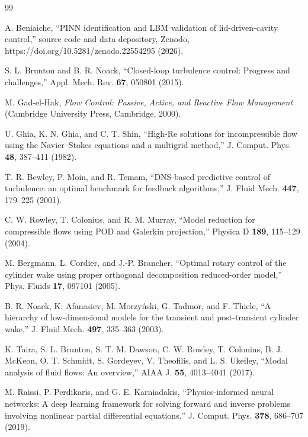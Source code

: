 \documentclass[aip,pof,reprint,superscriptaddress]{revtex4-2}
\begin{document}
\begin{thebibliography}{99}

A. Beniaiche, ``PINN identification and LBM validation of lid-driven-cavity control,'' source code and data depository, Zenodo, https://doi.org/10.5281/zenodo.22554295 (2026).

 S. L. Brunton and B. R. Noack, ``Closed-loop turbulence control: Progress and challenges,'' Appl. Mech. Rev. \textbf{67}, 050801 (2015).

 M. Gad-el-Hak, \emph{Flow Control: Passive, Active, and Reactive Flow Management} (Cambridge University Press, Cambridge, 2000).

 U. Ghia, K. N. Ghia, and C. T. Shin, ``High-Re solutions for incompressible flow using the Navier--Stokes equations and a multigrid method,'' J. Comput. Phys. \textbf{48}, 387--411 (1982).

 T. R. Bewley, P. Moin, and R. Temam, ``DNS-based predictive control of turbulence: an optimal benchmark for feedback algorithms,'' J. Fluid Mech. \textbf{447}, 179--225 (2001).

 C. W. Rowley, T. Colonius, and R. M. Murray, ``Model reduction for compressible flows using POD and Galerkin projection,'' Physica D \textbf{189}, 115--129 (2004).

 M. Bergmann, L. Cordier, and J.-P. Brancher, ``Optimal rotary control of the cylinder wake using proper orthogonal decomposition reduced-order model,'' Phys. Fluids \textbf{17}, 097101 (2005).

 B. R. Noack, K. Afanasiev, M. Morzy\'nski, G. Tadmor, and F. Thiele, ``A hierarchy of low-dimensional models for the transient and post-transient cylinder wake,'' J. Fluid Mech. \textbf{497}, 335--363 (2003).

 K. Taira, S. L. Brunton, S. T. M. Dawson, C. W. Rowley, T. Colonius, B. J. McKeon, O. T. Schmidt, S. Gordeyev, V. Theofilis, and L. S. Ukeiley, ``Modal analysis of fluid flows: An overview,'' AIAA J. \textbf{55}, 4013--4041 (2017).

 M. Raissi, P. Perdikaris, and G. E. Karniadakis, ``Physics-informed neural networks: A deep learning framework for solving forward and inverse problems involving nonlinear partial differential equations,'' J. Comput. Phys. \textbf{378}, 686--707 (2019).


\end{thebibliography}
\end{document}
